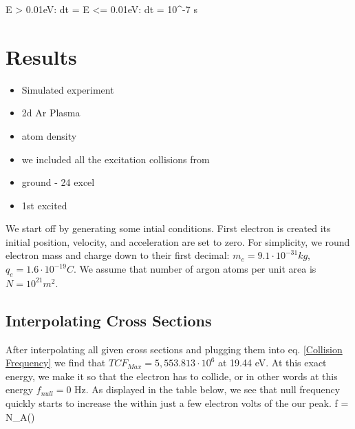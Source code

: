 \documentclass[12pt]{article}
\begin{document}
\beqn
E > 0.01eV: dt = 
\label{E > 0.01}
\eeqn
\vspace{-0.8 cm}
\beqn
E <= 0.01eV: dt = 10^{-7} s
\label{E <= 0.01}
\eeqn







\section{Results}

\begin{itemize}
	\item Simulated experiment
	\item 2d Ar Plasma
	\item atom density
	\item we included all the excitation collisions from
		\item  ground - 24 excel
		\item 1st excited 
\end{itemize}



We start off by generating some intial conditions.
First electron is created its initial position, velocity, and acceleration are set to zero. For simplicity, we round
electron mass and charge down to their first decimal: $m_{e} = 9.1\cdot10^{-31} kg$, $q_{e} = 
1.6\cdot10^{-19} C$. We assume that number of 
argon atoms per unit area is $N = 10^{21} m^2$. 




\subsection{Interpolating Cross Sections}
After interpolating all given cross sections and plugging them into eq. \ref{Collision 
	Frequency} we find that $TCF_{Max}  =  5,553.813\cdot10^6$ at 19.44 eV. At this exact 
energy, we make it so that the electron has to collide, or in other words at this energy 
$f_{null} = 0 $ Hz. As displayed in the table below, we see that null frequency quickly starts to increase the within just a few electron volts of the our peak. 
\beqn
f = N_{A}\sigma(\epsilon)  
\label{Collision Frequency}
\eeqn
\end{document}
